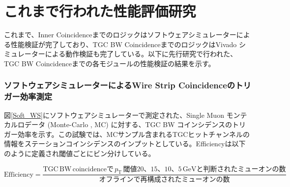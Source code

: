 \section{これまで行われた性能評価研究}
これまで、Inner Coincidenceまでのロジックはソフトウェアシミュレーターによる性能検証が完了しており、TGC BW CoincidenceまでのロジックはVivado シミュレーターによる動作検証も完了している。以下に先行研究で行われた、TGC BW Coincidenceまでの各モジュールの性能検証の結果を示す。

\subsubsection*{ソフトウェアシミュレーターによるWire Strip Coincidenceのトリガー効率測定}
図\ref{Soft_WS}にソフトウェアシミュレーターで測定された、Single Muon モンテカルロデータ (Monte-Carlo , MC) に対する、TGC BW コインシデンスのトリガー効率を示す。この試験では、MCサンプル含まれるTGCヒットチャンネルの情報をステーションコインシデンスのインプットとしている。Efficiencyは以下のように定義され\pt 閾値ごとにビン分けしている。

\begin{equation}
    \mathrm{Efficiency} = \frac{\mathrm{TGC\,BW\,coincidenceで}\,p_{\mathrm{T}}\,閾値20、15、10、5\,\mathrm{GeV}と判断されたミューオンの数}{オフラインで再構成されたミューオンの数}
\end{equation}

